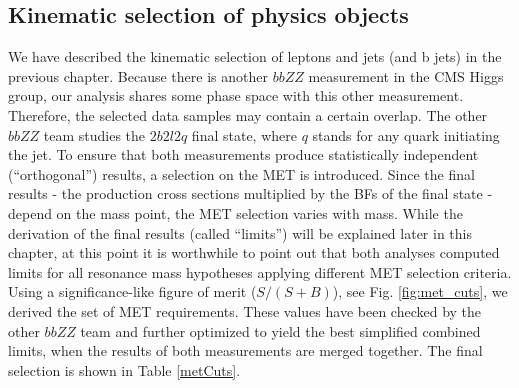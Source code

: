 \subsection{Kinematic selection of physics objects}
We have described the kinematic selection of leptons and jets (and b jets) in the previous chapter. Because there is another $bbZZ$ measurement in the CMS Higgs group, our analysis shares some phase space with this other measurement. Therefore, the selected data samples may contain a certain overlap. The other $bbZZ$ team studies the $2 b 2 l 2 q$ final state, where $q$ stands for any quark initiating the jet. To ensure that both measurements produce statistically independent (``orthogonal'') results, a selection on the MET is introduced. Since the final results - the production cross sections multiplied by the BFs of the final state - depend on the mass point, the MET selection varies with mass. While the derivation of the final results (called ``limits'') will be explained later in this chapter, at this point it is worthwhile to point out that both analyses computed limits for all resonance mass hypotheses applying different MET selection criteria. Using a significance-like figure of merit ($S/(S+B)$), see Fig. \ref{fig:met_cuts}, we derived the set of MET requirements. These values have been checked by the other $bbZZ$ team and further optimized to yield the best simplified combined limits, when the results of both measurements are merged together. The final selection is shown in Table \ref{metCuts}.  %

